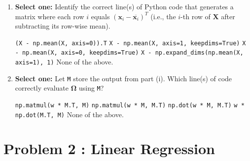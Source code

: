 \documentclass[11pt,addpoints,answers]{exam}
\newcommand{\xv}{\mathbf{x}}
\newcommand{\Xv}{\mathbf{X}}
\newcommand{\Omegav}{\boldsymbol{\Omega}}
\newcommand{\sone}{\textbf{Select one: }}
\begin{document}
\begin{enumerate}[label=\alph*), itemsep=10pt]
\begin{enumerate}[label=(\roman*), leftmargin=*]
			\item \sone Identify the correct line(s) of Python code that generates a matrix where each row $i$ equals $\left(\xv_i - \overline{\xv_i}\right)^T$ (i.e., the $i$-th row of $\Xv$ after subtracting its row-wise mean).
			
			{%
				\checkboxchar{$\Box$} \checkedchar{$\blacksquare$}
				\begin{checkboxes}
					\choice \texttt{(X - np.mean(X, axis=0)).T}
					\CorrectChoice \texttt{X - np.mean(X, axis=1, keepdims=True)}
					\choice \texttt{X - np.mean(X, axis=0, keepdims=True)}
					\choice \texttt{X - np.expand\_dims(np.mean(X, axis=1), 1)}
					\choice None of the above.
				\end{checkboxes}
			}
			
			
			\item \sone Let \texttt{M} store the output from part (i). Which line(s) of code correctly evaluate $\Omegav$ using \texttt{M}? \\
			
			{
				\checkboxchar{$\Box$} \checkedchar{$\blacksquare$}
				\begin{samepage}
					\begin{checkboxes}
						\CorrectChoice \texttt{np.matmul(w * M.T, M)}
						\choice \texttt{np.matmul(w * M, M.T)}
						\choice \texttt{np.dot(w * M, M.T)}
						\choice \texttt{w * np.dot(M.T, M)}
						\choice None of the above.
					\end{checkboxes}
				\end{samepage}
			}
			
			
		\end{enumerate}
		
	\end{enumerate}
	\section*{Problem 2 : Linear Regression}
	
\end{document}
